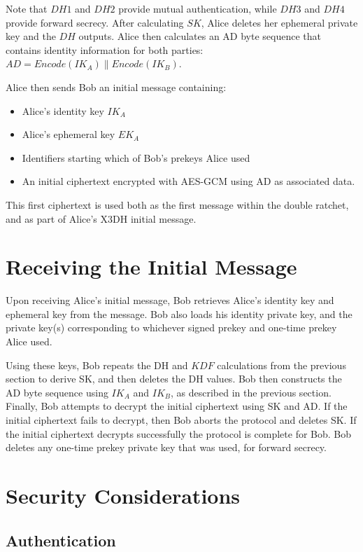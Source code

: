 Note that $DH1$ and $DH2$ provide mutual authentication, while $DH3$ and $DH4$ provide forward secrecy. After calculating $SK$, Alice deletes her ephemeral private key and the $DH$ outputs. Alice then calculates an AD byte sequence that contains identity information for both parties: $AD = Encode(IK_A) \| Encode(IK_B)$.

Alice then sends Bob an initial message containing:

\begin{itemize}
  \item Alice's identity key $IK_A$
  \item Alice's ephemeral key $EK_A$
  \item Identifiers starting which of Bob's prekeys Alice used
  \item An initial ciphertext encrypted with AES-GCM using AD as associated data.
\end{itemize}

This first ciphertext is used both as the first message within the double ratchet, and as part of Alice's X3DH initial message.

\section{Receiving the Initial Message}
\label{sec:ReceivingTheInitialMessage}

Upon receiving Alice's initial message, Bob retrieves Alice's identity key and ephemeral key from the message. Bob also loads his identity private key, and the private key(s) corresponding to whichever signed prekey and one-time prekey Alice used.

Using these keys, Bob repeats the DH and $KDF$ calculations from the previous section to derive SK, and then deletes the DH values. Bob then constructs the AD byte sequence using $IK_A$ and $IK_B$, as described in the previous section. Finally, Bob attempts to decrypt the initial ciphertext using SK and AD. If the initial ciphertext fails to decrypt, then Bob aborts the protocol and deletes SK. If the initial ciphertext decrypts successfully the protocol is complete for Bob. Bob deletes any one-time prekey private key that was used, for forward secrecy.

\section{Security Considerations}
\label{sec:SecurityConsideration}

\subsection{Authentication}
\label{subsec:Authentication}

